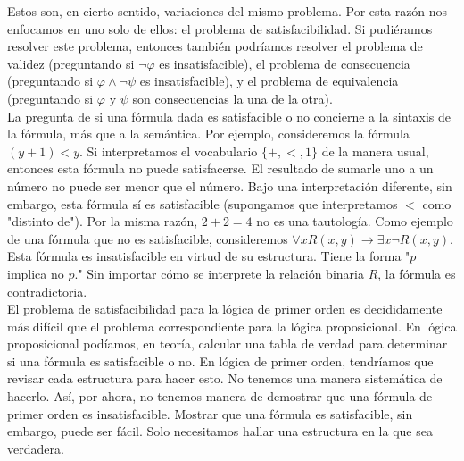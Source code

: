 \documentclass[12pt,a4paper]{book}
\newcommand{\comillas}[1]{"#1"}
\begin{document}
    Estos son, en cierto sentido, variaciones del mismo problema. Por esta razón nos enfocamos en uno solo de ellos: el
    problema de satisfacibilidad. Si pudiéramos resolver este problema, entonces también podríamos resolver el problema de
    validez (preguntando si $\neg\varphi$ es insatisfacible), el problema de consecuencia (preguntando si
    $\varphi\wedge\neg\psi$ es insatisfacible), y el problema de equivalencia (preguntando si $\varphi$ y $\psi$ son
    consecuencias la una de la otra).\\
    La pregunta de si una fórmula dada es satisfacible o no concierne a la sintaxis de la fórmula, más que a la semántica.
    Por ejemplo, consideremos la fórmula $(y+1)<y$. Si interpretamos el vocabulario $\{+,<,1\}$ de la manera usual, entonces
    esta fórmula no puede satisfacerse. El resultado de sumarle uno a un número no puede ser menor que el número. Bajo una
    interpretación diferente, sin embargo, esta fórmula sí es satisfacible (supongamos que interpretamos $<$ como
    \comillas{distinto de}). Por la misma razón, $2+2=4$ no es una tautología. Como ejemplo de una fórmula que no es
    satisfacible, consideremos $\forall xR(x,y)\rightarrow\exists x\neg R(x,y)$. Esta fórmula es insatisfacible en virtud
    de su estructura. Tiene la forma \comillas{$p$ implica no $p$.} Sin importar cómo se interprete la relación binaria
    $R$, la fórmula es contradictoria.\\
    El problema de satisfacibilidad para la lógica de primer orden es decididamente más difícil que el problema
    correspondiente para la lógica proposicional. En lógica proposicional podíamos, en teoría, calcular una tabla de verdad
    para determinar si una fórmula es satisfacible o no. En lógica de primer orden, tendríamos que revisar cada estructura
    para hacer esto. No tenemos una manera sistemática de hacerlo. Así, por ahora, no tenemos manera de demostrar que una
    fórmula de primer orden es insatisfacible. Mostrar que una fórmula es satisfacible, sin embargo, puede ser fácil. Solo
    necesitamos hallar una estructura en la que sea verdadera.
\end{document}
